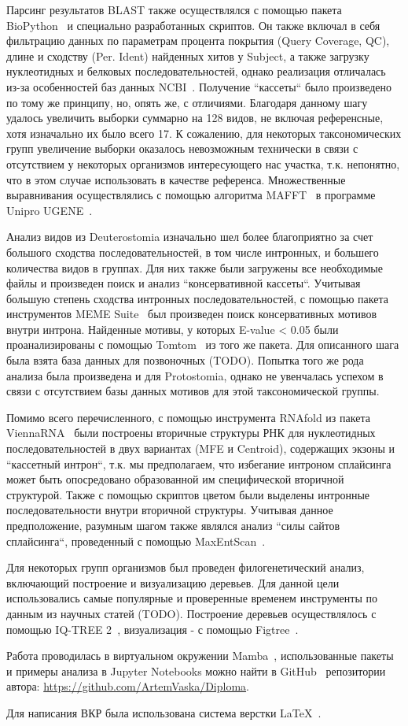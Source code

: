 Парсинг результатов BLAST также осуществлялся с помощью пакета BioPython~\cite{biopython} и специально разработанных скриптов.
Он также включал в себя фильтрацию данных по параметрам процента покрытия (Query Coverage, QC), длине и сходству (Per. Ident) найденных хитов у Subject, а также загрузку нуклеотидных и белковых последовательностей, однако реализация отличалась из-за особенностей баз данных NCBI~\cite{ncbi_general}.
Получение ``кассеты`` было произведено по тому же принципу, но, опять же, с отличиями.
Благодаря данному шагу удалось увеличить выборки суммарно на 128 видов, не включая референсные, хотя изначально их было всего 17.
К сожалению, для некоторых таксономических групп увеличение выборки оказалось невозможным технически в связи с отсутствием у некоторых организмов интересующего нас участка, т.к. непонятно, что в этом случае использовать в качестве референса.
Множественные выравнивания осуществлялись с помощью алгоритма MAFFT~\cite{mafft} в программе Unipro UGENE~\cite{ugene}.

Анализ видов из Deuterostomia изначально шел более благоприятно за счет большого сходства последовательностей, в том числе интронных, и большего количества видов в группах.
Для них также были загружены все необходимые файлы и произведен поиск и анализ ``консервативной кассеты``.
Учитывая большую степень сходства интронных последовательностей, с помощью пакета инструментов MEME Suite~\cite{meme} был произведен поиск консервативных мотивов внутри интрона.
Найденные мотивы, у которых E-value < 0.05 были проанализированы с помощью Tomtom~\cite{tomtom} из того же пакета.
Для описанного шага была взята база данных для позвоночных (TODO).
Попытка того же рода анализа была произведена и для Protostomia, однако не увенчалась успехом в связи с отсутствием базы данных мотивов для этой таксономической группы.

Помимо всего перечисленного, с помощью инструмента RNAfold из пакета Vienna\-RNA~\cite{viennarna} были построены вторичные структуры РНК для нуклеотидных последовательностей в двух вариантах (MFE и Centroid), содержащих экзоны и ``кассетный интрон``, т.к. мы предполагаем, что избегание интроном сплайсинга может быть опосредовано образованной им специфической вторичной структурой.
Также с помощью скриптов цветом были выделены интронные последовательности внутри вторичной структуры.
Учитывая данное предположение, разумным шагом также являлся анализ ``силы сайтов сплайсинга``, проведенный с помощью MaxEntScan~\cite{maxentsccan}.

Для некоторых групп организмов был проведен филогенетический анализ, включающий построение и визуализацию деревьев.
Для данной цели использовались самые популярные и проверенные временем инструменты по данным из научных статей (TODO).
Построение деревьев осуществлялось с помощью IQ-TREE 2~\cite{iqtree2}, визуализация - с помощью Figtree~\cite{figtree}.

Работа проводилась в виртуальном окружении Mamba~\cite{mamba}, использованные пакеты и примеры анализа в Jupyter Notebooks можно найти в GitHub~\cite{github_general} репозитории автора: \url{https://github.com/ArtemVaska/Diploma}.

Для написания ВКР была использована система верстки LaTeX~\cite{latex}.
